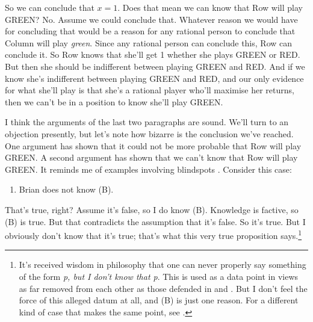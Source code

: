So we can conclude that $x = 1$. Does that mean we can know that Row will play GREEN? No. Assume we could conclude that. Whatever reason we would have for concluding that would be a reason for any rational person to conclude that Column will play \textit{green}. Since any rational person can conclude this, Row can conclude it. So Row knows that she'll get 1 whether she plays GREEN or RED. But then she should be indifferent between playing GREEN and RED. And if we know she's indifferent between playing GREEN and RED, and our only evidence for what she'll play is that she's a rational player who'll maximise her returns, then we can't be in a position to know she'll play GREEN.

I think the arguments of the last two paragraphs are sound. We'll turn to an objection presently, but let's note how bizarre is the conclusion we've reached. One argument has shown that it could not be more probable that Row will play GREEN. A second argument has shown that we can't know that Row will play GREEN. It reminds me of examples involving blindspots \citep{Sorensen1988}. Consider this case:

\begin{enumerate}
\renewcommand{\labelenumi}{(\Alph{enumi})}
\setcounter{enumi}{1}
\item Brian does not know (B).
\end{enumerate}
That's true, right? Assume it's false, so I do know (B). Knowledge is factive, so (B) is true. But that contradicts the assumption that it's false. So it's true. But I obviously don't know that it's true; that's what this very true proposition says.\footnote{It's received wisdom in philosophy that one can never properly say something of the form \textit{p, but I don't know that p}. This is used as a data point in views as far removed from each other as those defended in \citet{Heal1994} and \citet{Williamson1996-WILKAA}. But I don't feel the force of this alleged datum at all, and (B) is just one reason. For a different kind of case that makes the same point, see \citet{MaitraWeatherson}.}

